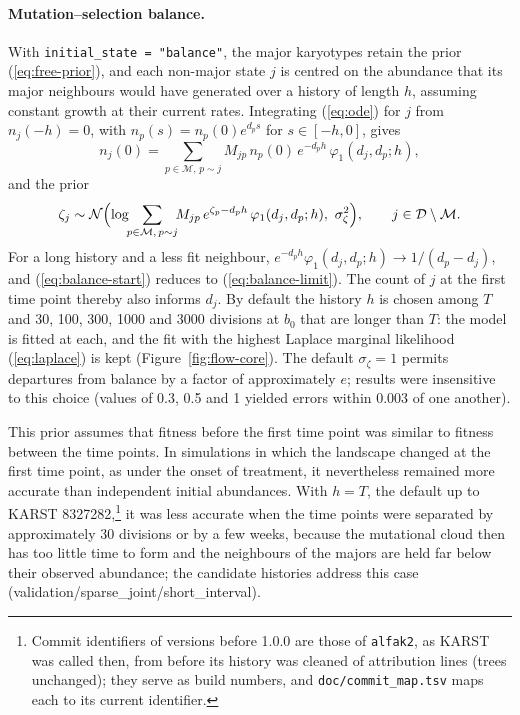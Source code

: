 \documentclass[11pt]{article}
\newcommand{\Normal}{\mathcal{N}}
\begin{document}
\paragraph{Mutation--selection balance.}
With \texttt{initial\_state = "balance"}, the major karyotypes retain the
prior (\ref{eq:free-prior}), and each non-major state $j$ is centred on the
abundance that its major neighbours would have generated over a history of
length $h$, assuming constant growth at their current rates. Integrating
(\ref{eq:ode}) for $j$ from $n_j(-h)=0$, with $n_p(s)=n_p(0)e^{d_ps}$ for
$s\in[-h,0]$, gives
\begin{equation}
  n_j(0)=\sum_{p\in\mathcal{M},\,p\sim j}M_{jp}\,n_p(0)\,e^{-d_ph}\,\varphi_1(d_j,d_p;h),
  \label{eq:balance-start}
\end{equation}
and the prior
\begin{equation}
  \zeta_j\sim\Normal\Bigl(\log\!\!\sum_{p\in\mathcal{M},\,p\sim j}\!\!M_{jp}\,
  e^{\zeta_p-d_ph}\,\varphi_1(d_j,d_p;h),\ \sigma_\zeta^2\Bigr),
  \qquad j\in\mathcal{D}\setminus\mathcal{M}.
  \label{eq:balance-prior}
\end{equation}
For a long history and a less fit neighbour,
$e^{-d_ph}\varphi_1(d_j,d_p;h)\to1/(d_p-d_j)$, and (\ref{eq:balance-start})
reduces to (\ref{eq:balance-limit}). The count of $j$ at the first time point
thereby also informs $d_j$. By default the history $h$ is chosen among $T$ and
30, 100, 300, 1000 and 3000 divisions at $b_0$ that are longer than $T$: the
model is fitted at each, and the fit with the highest Laplace marginal
likelihood (\ref{eq:laplace}) is kept (Figure~\ref{fig:flow-core}). The
default $\sigma_\zeta=1$ permits departures from balance by a factor of
approximately $e$; results were insensitive to this choice (values of 0.3, 0.5
and 1 yielded errors within 0.003 of one another).

This prior assumes that fitness before the first time point was similar to
fitness between the time points. In simulations in which the landscape changed at
the first time point, as under the onset of treatment, it nevertheless remained
more accurate than independent initial abundances. With $h=T$, the default up
to KARST 8327282,\footnote{Commit identifiers of versions before 1.0.0 are
those of \texttt{alfak2}, as KARST was called then, from before its history
was cleaned of attribution lines (trees unchanged); they serve as build
numbers, and \texttt{doc/commit\_map.tsv} maps each to its current
identifier.} it was less accurate when the time points were separated by
approximately 30 divisions or by a few weeks, because the mutational cloud
then has too little time to form and the neighbours of the majors are held far
below their observed abundance; the candidate histories address this case
(validation/sparse\_joint/short\_interval).
\end{document}
